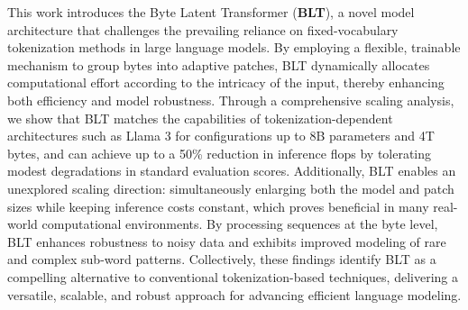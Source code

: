 This work introduces the Byte Latent Transformer (\textbf{BLT}), a novel model architecture that challenges the prevailing reliance on fixed-vocabulary tokenization methods in large language models. By employing a flexible, trainable mechanism to group bytes into adaptive patches, {\textsc BLT} dynamically allocates computational effort according to the intricacy of the input, thereby enhancing both efficiency and model robustness. Through a comprehensive scaling analysis, we show that {\textsc BLT} matches the capabilities of tokenization-dependent architectures such as Llama 3 for configurations up to 8B parameters and 4T bytes, and can achieve up to a 50\% reduction in inference flops by tolerating modest degradations in standard evaluation scores. Additionally, {\textsc BLT} enables an unexplored scaling direction: simultaneously enlarging both the model and patch sizes while keeping inference costs constant, which proves beneficial in many real-world computational environments. By processing sequences at the byte level, {\textsc BLT} enhances robustness to noisy data and exhibits improved modeling of rare and complex sub-word patterns. Collectively, these findings identify {\textsc BLT} as a compelling alternative to conventional tokenization-based techniques, delivering a versatile, scalable, and robust approach for advancing efficient language modeling.

